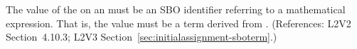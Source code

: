 The value of the   on an \InitialAssignment must be an
SBO identifier referring to a mathematical expression.  That is, the value
must be a term derived from \sbomathformula.  (References: L2V2 Section~4.10.3;
L2V3 Section~\ref{sec:initialassignment-sboterm}.)
